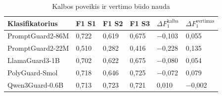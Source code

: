 \begin{table}[H]
  \caption{Kalbos poveikis ir vertimo būdo nauda}\label{lent:skirtumai}
  \lentelesTekstas
  \small
  \begin{tabularx}{\textwidth}{|>{\raggedright\arraybackslash}X|C{1.4cm}|C{1.4cm}|C{1.4cm}|C{2.3cm}|C{2.3cm}|}
    \hline
    \textbf{Klasifikatorius} & \textbf{F1 S1} & \textbf{F1 S2} & \textbf{F1 S3} & \textbf{$\Delta F_1^{\mathrm{kalba}}$} & \textbf{$\Delta F_1^{\mathrm{vertimas}}$} \\
    \hline
    PromptGuard2-86M & 0,722 & 0,619 & 0,675 & $-$0,103 & 0,055 \\
    \hline
    PromptGuard2-22M & 0,510 & 0,282 & 0,416 & $-$0,228 & 0,135 \\
    \hline
    LlamaGuard3-1B & 0,702 & 0,622 & 0,675 & $-$0,080 & 0,054 \\
    \hline
    PolyGuard-Smol & 0,718 & 0,646 & 0,725 & $-$0,072 & 0,079 \\
    \hline
    Qwen3Guard-0.6B & 0,713 & 0,723 & 0,721 & 0,010 & $-$0,002 \\
    \hline
  \end{tabularx}
\end{table}

